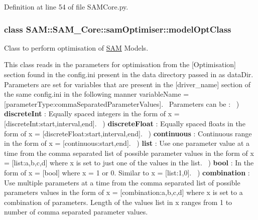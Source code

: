 Definition at line 54 of file S\+A\+M\+Core.\+py.

\label{classSAM_1_1SAM__Core_1_1samOptimiser_1_1modelOptClass}
\subsubsection{class S\+AM\+:\+:S\+A\+M\+\_\+\+Core\+:\+:sam\+Optimiser\+:\+:model\+Opt\+Class}
Class to perform optimisation of \hyperlink{namespaceSAM}{S\+AM} Models. 

This class reads in the parameters for optimisation from the {\ttfamily \mbox{[}Optimisation\mbox{]}} section found in the config.\+ini present in the data directory passed in as data\+Dir. Parameters are set for variables that are present in the {\ttfamily \mbox{[}driver\+\_\+name\mbox{]}} section of the same config.\+ini in the following manner {\ttfamily variable\+Name = \mbox{[}parameter\+Type\+:comma\+Separated\+Parameter\+Values\mbox{]}}.~\newline
 Parameters can be \+: ~) {\bfseries discrete\+Int} \+: Equally spaced integers in the form of {\ttfamily x = \mbox{[}discrete\+Int\+:start,interval,end\mbox{]}}. ~) {\bfseries discrete\+Float} \+: Equally spaced floats in the form of {\ttfamily x = \mbox{[}discrete\+Float\+:start,interval,end\mbox{]}}. ~) {\bfseries continuous} \+: Continuous range in the form of {\ttfamily x = \mbox{[}continuous\+:start,end\mbox{]}}. ~) {\bfseries list} \+: Use one parameter value at a time from the comma separated list of possible parameter values in the form of {\ttfamily x = \mbox{[}list\+:a,b,c,d\mbox{]}} where x is set to just one of the values in the list. ~) {\bfseries bool} \+: In the form of {\ttfamily x = \mbox{[}bool\mbox{]}} where x = 1 or 0. Similar to {\ttfamily x = \mbox{[}list\+:1,0\mbox{]}}. ~) {\bfseries combination} \+: Use multiple parameters at a time from the comma separated list of possible parameters values in the form of {\ttfamily x = \mbox{[}combination\+:a,b,c,d\mbox{]}} where x is set to a combination of parameters. Length of the values list in x ranges from 1 to number of comma separated parameter values. ~\newline
